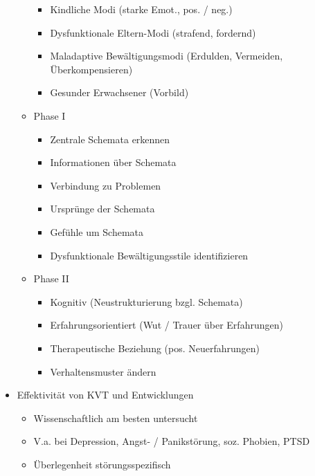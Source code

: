 \documentclass[11pt, paper=a4, twocolumn]{scrartcl}
\begin{document}
\begin{itemize}
\begin{itemize}
						\begin{itemize}
							\item Kindliche Modi (starke Emot., pos. / neg.)
							\item Dysfunktionale Eltern-Modi (strafend, fordernd)
							\item Maladaptive Bewältigungsmodi (Erdulden, Vermeiden, Überkompensieren)
							\item Gesunder Erwachsener (Vorbild)
						\end{itemize}
					\item Phase I
						\begin{itemize}
							\item Zentrale Schemata erkennen
							\item Informationen über Schemata
							\item Verbindung zu Problemen
							\item Ursprünge der Schemata
							\item Gefühle um Schemata
							\item Dysfunktionale Bewältigungsstile identifizieren
						\end{itemize}
					\item Phase II
						\begin{itemize}
							\item Kognitiv (Neustrukturierung bzgl. Schemata)
							\item Erfahrungsorientiert (Wut / Trauer über Erfahrungen)
							\item Therapeutische Beziehung (pos. Neuerfahrungen)
							\item Verhaltensmuster ändern
						\end{itemize}
				\end{itemize}
			\item Effektivität von KVT und Entwicklungen
				\begin{itemize}
					\item Wissenschaftlich am besten untersucht
					\item V.a. bei Depression, Angst- / Panikstörung, soz. Phobien, PTSD
					\item Überlegenheit störungsspezifisch
				\end{itemize}
		\end{itemize}
\end{document}
